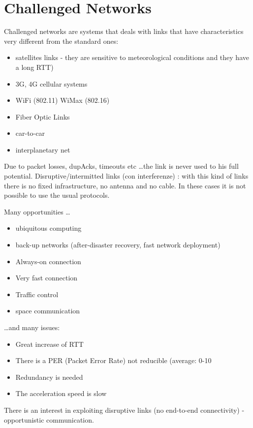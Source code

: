 \newpage
\section{Challenged Networks}

Challenged networks are systems that deals with links that have
characteristics very different from the standard ones:

\begin{itemize}
  \item satellites links - they are sensitive to meteorological conditions
and they have a long RTT)
  \item 3G, 4G cellular systems
  \item WiFi (802.11) WiMax (802.16)
  \item Fiber Optic Links
  \item car-to-car
  \item interplanetary net
\end{itemize}

Due to packet losses, dupAcks, timeouts etc \dots the link is never used
to his full potential.
Disruptive/intermitted links (con interferenze) : with this kind of links
there is no fixed infrastructure, no antenna and no cable.
In these cases it is not possible to use the usual protocols.

Many opportunities \dots

\begin{itemize}
  \item ubiquitous computing
  \item back-up networks (after-disaster recovery, fast network deployment)
  \item Always-on connection
  \item Very fast connection
  \item Traffic control
  \item space communication
\end{itemize}

\dots and many issues:

\begin{itemize}
  \item Great increase of RTT
  \item There is a PER (Packet Error Rate) not reducible (average: 0-10%
  \item Redundancy is needed
  \item The acceleration speed is slow
\end{itemize}

There is an interest in exploiting disruptive links (no end-to-end
connectivity) - opportunistic communication.

